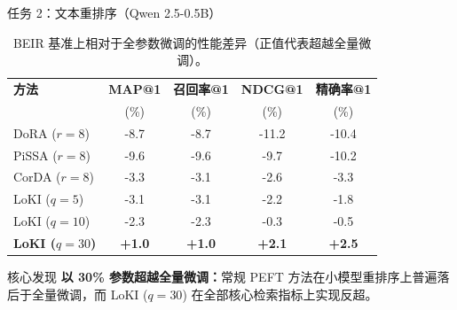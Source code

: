 \documentclass{beamer}
\begin{document}
    \begin{frame}{任务 2：文本重排序（Qwen 2.5-0.5B）}
        \begin{table}
            \centering
            \scriptsize
            \setlength{\tabcolsep}{6pt}
            \begin{tabular}{l|cccc}
                \toprule
                \textbf{方法} & \textbf{MAP@1} & \textbf{召回率@1} & \textbf{NDCG@1} & \textbf{精确率@1} \\
                & (\%) & (\%) & (\%) & (\%) \\
                \midrule
                DoRA ($r=8$) \cite{liu2024dora}& -8.7 & -8.7 & -11.2 & -10.4 \\
                PiSSA ($r=8$) \cite{meng2024pissa}& -9.6 & -9.6 & -9.7 & -10.2 \\
                CorDA ($r=8$) \cite{yang2024corda}& -3.3 & -3.1 & -2.6 & -3.3 \\
                \midrule
                LoKI ($q=5$) & -3.1 & -3.1 & -2.2 & -1.8 \\
                LoKI ($q=10$) & -2.3 & -2.3 & -0.3 & -0.5 \\
                \textbf{LoKI ($q=30$)} & \alert{\textbf{+1.0}} & \alert{\textbf{+1.0}} & \alert{\textbf{+2.1}} & \alert{\textbf{+2.5}} \\
                \bottomrule
            \end{tabular}
            \caption{BEIR 基准上相对于全参数微调的性能差异（正值代表超越全量微调）。}
        \end{table}
        \vspace{-0.2em}
        \begin{alertblock}{核心发现}
            \small\textbf{以 30\% 参数超越全量微调：}常规 PEFT 方法在小模型重排序上普遍落后于全量微调，而 LoKI ($q=30$) 在全部核心检索指标上实现反超。
        \end{alertblock}
    \end{frame}
\end{document}
